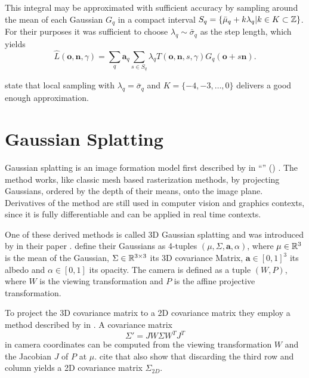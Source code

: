 \documentclass[a4paper, 11pt]{memoir}
\begin{document}
    This integral may be approximated with sufficient accuracy by sampling around the mean of each Gaussian $G_q$ in
    a compact interval $S_q = \{ \bar{\mu}_q + k\lambda_q | k \in K \subset \mathbb{Z} \}$. For their purposes it was sufficient
    to choose $\lambda_q \sim \bar{\sigma}_q$ as the step length, which yields
    \begin{equation}
        \hat{L}(\mathbf{o}, \mathbf{n}, \gamma) = \sum_q \mathbf{a}_q \sum_{s \in S_q}
            \lambda_q T(\mathbf{o}, \mathbf{n}, s, \gamma)G_q(\mathbf{o} + s\mathbf{n}).
        \label{eq:radiance}
    \end{equation}

    \citeauthor{Rhodin:2015} state that local sampling with $\lambda_q = \bar{\sigma}_q$ and $K = \{ -4, -3, \dots, 0 \}$
    delivers a good enough approximation.

    \section{Gaussian Splatting}
    \label{sec:splatting}
    Gaussian splatting is an image formation model first described by \citeauthor{splatting} in \enquote{}
    (\citeyear{splatting}) \cite{splatting}. The method works, like classic mesh based rasterization methods, by projecting
    Gaussians, ordered by the depth of their means, onto the image plane. Derivatives of the method are still used in computer vision
    and graphics contexts, since it is fully differentiable and can be applied in real time contexts.

    One of these derived methods is called 3D Gaussian splatting and was introduced by \citeauthor{kerbl3Dgaussians} in
    their \citeyear{kerbl3Dgaussians} paper \cite{kerbl3Dgaussians}. \citeauthor{kerbl3Dgaussians}
    define their Gaussians as 4-tuples $(\mu, \Sigma, \mathbf{a}, \alpha)$, where $\mu \in \mathbb{R}^3$ is the mean of the
    Gaussian, $\Sigma \in \mathbb{R}^{3\times 3}$ its 3D covariance Matrix, $\mathbf{a} \in [0, 1]^3$ its albedo and
    $\alpha \in [0, 1]$ its opacity. The camera is defined as a tuple $(W, P)$, where $W$ is the viewing transformation
    and $P$ is the affine projective transformation.

    To project the 3D covariance matrix to a 2D covariance matrix they employ a method described by \citeauthor{volume_splatting}
    in \cite{volume_splatting}. A covariance matrix
    \begin{equation}
        \Sigma' = JW\Sigma W^TJ^T
    \end{equation}
    in camera coordinates can be computed from the viewing transformation $W$ and the Jacobian $J$ of $P$ at $\mu$.
    \citeauthor{kerbl3Dgaussians} cite that \citeauthor{volume_splatting} also show that discarding the third row and
    column yields a 2D covariance matrix $\Sigma_{2D}$.
\end{document}
